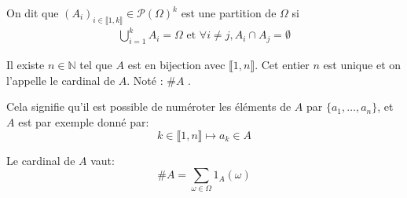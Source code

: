     \begin{definition}
      On dit que $\left(A_i\right)_{i\in\llbracket 1,k\rrbracket} \in \mathcal{P}(\Omega)^k$
      est une partition de $\Omega$ si
      \begin{eqnarray*}
        \bigcup_{i=1}^k A_i = \Omega \text{ et } \forall i\neq j, A_i\cap A_j = \emptyset
      \end{eqnarray*}
    \end{definition}

    \begin{definition}
      Il existe $n\in\mathbb{N}$ tel que $A$ est en bijection avec $\llbracket 1,n \rrbracket$.
      Cet entier $n$ est unique et on l'appelle le cardinal de $A$.
      Noté : $\#A$ .%
    \end{definition}

    Cela signifie qu'il est possible de numéroter les éléments de $A$ par $\{a_1, \dots, a_n\}$,
    et $A$ est par exemple donné par:
    \[ k \in \llbracket 1, n \rrbracket \mapsto a_k \in A\]

    \begin{proposition}
      Le cardinal de $A$ vaut:
      \[\#A = \sum_{\omega\in \Omega} 1_A(\omega)\]
    \end{proposition}
